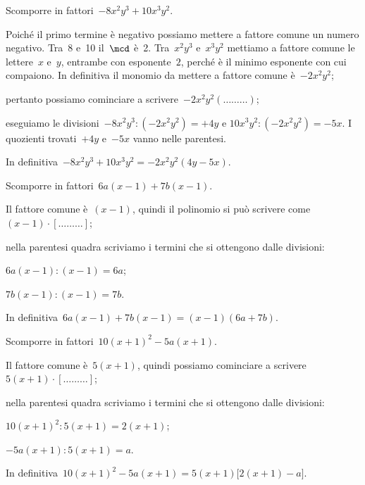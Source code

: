\begin{exrig}
 \begin{esempio}
Scomporre in fattori~$-8x^{2}y^{3}+10x^{3}y^{2}$.
 \begin{enumeratea}
  \item Poiché il primo termine è negativo possiamo mettere a fattore comune un 
  numero negativo. Tra~8 e~10 il~$\mcd$ è~2. Tra~$x^{2}y^{3}$ e~$x^{3}y^{2}$ mettiamo 
  a fattore comune le lettere~$x$ e~$y$, entrambe con esponente~$2$, perché è
     il minimo esponente con cui compaiono. In definitiva il monomio da mettere a fattore comune è~$-2x^{2}y^{2}$;
  \item pertanto possiamo cominciare a scrivere~$-2x^{2}y^{2}(\ldots \ldots \ldots)$;
  \item eseguiamo le divisioni~$-8x^{2}y^{3}:(-2x^{2}y^{2})=+4y$ e  $10x^{3}y^{2}:(-2x^{2}y^{2})=-5x$. 
  I quozienti trovati~$+4y$ e~$-5x$ vanno nelle parentesi.
 \end{enumeratea}
 In definitiva~$-8x^{2}y^{3}+10x^{3}y^{2}=-2x^{2}y^{2}(4y-5x)$.
 \end{esempio}

 \begin{esempio}
Scomporre in fattori~$6a(x-1)+7b(x-1)$.
  \begin{enumeratea}
  \item Il fattore comune è~$(x-1)$, quindi il polinomio si può scrivere come~$(x-1)\cdot [\ldots \ldots \ldots]$;
  \item nella parentesi quadra scriviamo i termini che si ottengono dalle divisioni:
   \begin{itemize*}
    \item $6a(x-1):(x-1)=6a$;
    \item $7b(x-1):(x-1)=7b$.
   \end{itemize*}
  \end{enumeratea}
  In definitiva~$6a(x-1)+7b(x-1)=(x-1)(6a+7b)$.
 \end{esempio}

 \begin{esempio}
Scomporre in fattori~$10(x+1)^{2}-5a(x+1)$.
  \begin{enumeratea}
  \item Il fattore comune è~$5(x+1)$, quindi possiamo cominciare a scrivere~$5(x+1)\cdot [\ldots \ldots \ldots]$;
  \item nella parentesi quadra scriviamo i termini che si ottengono dalle divisioni:
   \begin{itemize*}
    \item $10(x+1)^{2}:5(x+1)=2(x+1)$;
    \item $-5a(x+1):5(x+1)=a$.
   \end{itemize*}
  \end{enumeratea}
  In definitiva~$10(x+1)^{2}-5a(x+1)=5(x+1)\bigl[2(x+1)-a \bigr]$.
 \end{esempio}

\end{exrig}

